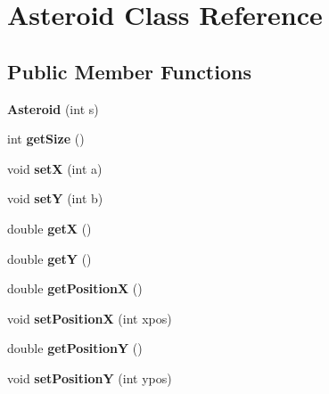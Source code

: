 \hypertarget{class_asteroid}{}\section{Asteroid Class Reference}
\label{class_asteroid}
\subsection*{Public Member Functions}
\begin{DoxyCompactItemize}
\item 
\mbox{\label{class_asteroid_a95ae7f2c8713965c85bd04f59efc30fa}} 
{\bfseries Asteroid} (int s)
\item 
\mbox{\label{class_asteroid_a80a894f9fcf11b20b995ade71862c9f2}} 
int {\bfseries get\+Size} ()
\item 
\mbox{\label{class_asteroid_a3a68d96e790d236741d3b65b16086280}} 
void {\bfseries setX} (int a)
\item 
\mbox{\label{class_asteroid_a18d68c0946b715d5e84697fa2a0142e2}} 
void {\bfseries setY} (int b)
\item 
\mbox{\label{class_asteroid_afb4955e2007d9b4efbf6395aac4d189a}} 
double {\bfseries getX} ()
\item 
\mbox{\label{class_asteroid_a9443f029e929927988bac74d5c2c1909}} 
double {\bfseries getY} ()
\item 
\mbox{\label{class_asteroid_a40ee7b2e349896a50b23a26776d2b256}} 
double {\bfseries get\+PositionX} ()
\item 
\mbox{\label{class_asteroid_ad3d3d383a2e14341961e48155458984e}} 
void {\bfseries set\+PositionX} (int xpos)
\item 
\mbox{\label{class_asteroid_a60bd18c724459601dd5479a2084f2084}} 
double {\bfseries get\+PositionY} ()
\item 
\mbox{\label{class_asteroid_af2727b4825f09e5e780a1fce9e3dcab2}} 
void {\bfseries set\+PositionY} (int ypos)

\end{DoxyCompactItemize}
